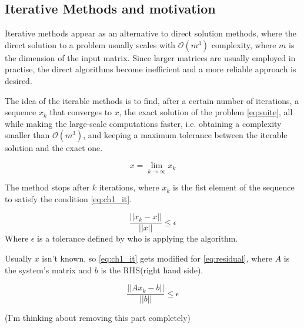 \subsection{Iterative Methods and motivation}


Iterative methods appear as an alternative to direct solution methods, where the direct solution to a problem usually scales with $\mathcal{O}(m^{3})$ complexity, where $m$ is the dimension of the input matrix. Since larger matrices are usually employed in practise, the direct algorithms become inefficient and a more reliable approach is desired.


The idea of the iterable methods is to find, after a certain number of iterations, a sequence ${x_{k}}$ that converges to $x$, the exact solution of the problem \ref{eq:suite}, all while making the large-scale computations faster, i.e. obtaining a complexity smaller than $\mathcal{O}(m^{3})$, and keeping a maximum tolerance between the iterable solution and the exact one.


\begin{equation}\label{eq:suite}
    x = \lim_{k \to \infty} x_{k}
\end{equation}


The method stops after $k$ iterations, where $x_{k}$ is the fist element of the sequence to satisfy the condition \ref{eq:ch1_it}.


\begin{equation}\label{eq:ch1_it}
    \frac{||x_{k} - x||}{||x||} \leq \epsilon
\end{equation}
Where $\epsilon$ is a tolerance defined by who is applying the algorithm.

Usually $x$ isn't known, so \ref{eq:ch1_it} gets modified for \ref{eq:residual}, where $A$ is the system's matrix and $b$ is the RHS(right hand side).

\begin{equation}\label{eq:residual}
    \frac{||Ax_{k} - b||}{||b||} \leq \epsilon
\end{equation}

(I'm thinking about removing this part completely)


